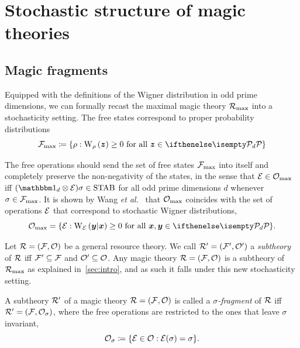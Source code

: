 \section{Stochastic structure of magic theories}
\label{sec:struc}

\subsection{Magic fragments}\label{sec:magfrag}

Equipped with the definitions of the Wigner distribution in odd prime dimensions, we can formally recast the maximal magic theory $\mathcal{R}_{\rm{}max}$ into a stochasticity setting.
The free states correspond to proper probability distributions 
\begin{equation}
    \Fmax \coloneqq \{ \rho: \W[\bmz]{\rho} \geq 0 \text{ for all } \bmz \in \pd\}
\end{equation}

The free operations should send the set of free states $\mathcal{F}_{\rm{max}}$ into itself and completely preserve the non-negativity of the states, in the sense that $\mathcal{E} \in \mathcal{O}_{\rm{}max}$ iff $(\id_d \otimes \E ) \sigma \in \stab$ for all odd prime dimensions $d$ whenever $\sigma \in \mathcal{F}_{\rm{max}}$.
It is shown by Wang \textit{et al.}~\cite{cit:wang} that $\mathcal{O}_{\rm{}max}$ coincides with the set of operations $\mathcal{E}$ that correspond to stochastic Wigner distributions, 
\begin{equation}
    \Omax = \{ \E: \W[\bmy|\bmx]{\E} \geq 0 \text{ for all } \bmx, \bmy \in \pd\}.
\end{equation}

Let $\mathcal{R} = (\mathcal{F}, \mathcal{O})$ be a general resource theory.
We call $\mathcal{R}' = (\mathcal{F}', \mathcal{O}')$ a \emph{subtheory} of $\mathcal{R}$ iff $\mathcal{F}' \subseteq \mathcal{F}$ and $\mathcal{O}' \subseteq \mathcal{O}$. 
Any magic theory $\mathcal{R} = (\mathcal{F}, \mathcal{O})$ is a subtheory of $\mathcal{R}_{\rm{}max}$ as explained in~\cref{sec:intro}, and as such it falls under this new stochasticity setting. 

\begin{definition}\label{def:sigmafrag}
    A subtheory $\mathcal{R}'$ of a magic theory $\mathcal{R} = (\mathcal{F}, \mathcal{O})$ is called a \emph{$\sigma$-fragment} of $\mathcal{R}$ iff $\mathcal{R}' = (\mathcal{F}, \mathcal{O}_\sigma)$, where the free operations are restricted to the ones that leave $\sigma$ invariant,
    \begin{equation}
        \mathcal{O}_\sigma \coloneqq \{ \mathcal{E} \in \mathcal{O}: \mathcal{E}(\sigma) = \sigma \}.
    \end{equation}
\end{definition}

